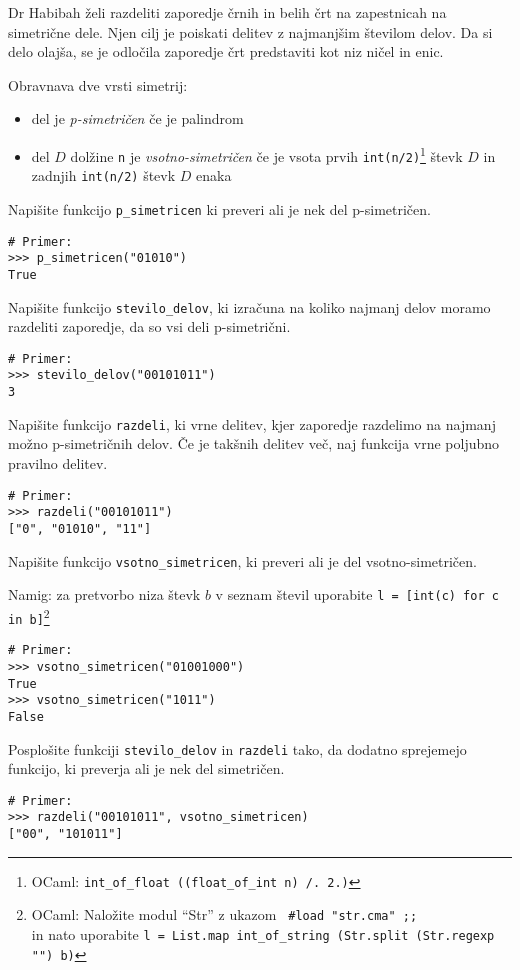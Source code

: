 \documentclass[arhiv]{../izpit}
\begin{document}
Dr Habibah želi razdeliti zaporedje črnih in belih črt na zapestnicah na simetrične dele. Njen cilj je poiskati delitev z najmanjšim številom delov.
Da si delo olajša, se je odločila zaporedje črt predstaviti kot niz ničel in enic.

Obravnava dve vrsti simetrij:
\begin{itemize}
\item del je \emph{p-simetričen} če je palindrom
\item del $D$ dolžine \verb|n| je \emph{vsotno-simetričen} če je vsota prvih
\verb|int(n/2)|\footnote{OCaml: \verb|int_of_float ((float_of_int n) /. 2.)|} števk $D$
  in zadnjih \verb|int(n/2)| števk $D$ enaka
\end{itemize}

\podnaloga
Napišite funkcijo \verb|p_simetricen| ki preveri ali je nek del p-simetričen.
\begin{verbatim}
# Primer:
>>> p_simetricen("01010")
True
\end{verbatim}

\podnaloga
Napišite funkcijo \verb|stevilo_delov|, ki izračuna na koliko najmanj delov moramo razdeliti zaporedje, da so vsi deli p-simetrični.

\begin{verbatim}
# Primer:
>>> stevilo_delov("00101011")
3
\end{verbatim}

\podnaloga
Napišite funkcijo \verb|razdeli|, ki vrne delitev, kjer zaporedje razdelimo na najmanj možno p-simetričnih delov. Če je takšnih delitev več, naj funkcija vrne poljubno pravilno delitev.

\begin{verbatim}
# Primer:
>>> razdeli("00101011")
["0", "01010", "11"]
\end{verbatim}

\podnaloga
Napišite funkcijo \verb|vsotno_simetricen|, ki preveri ali je del vsotno-simetričen.

Namig: za pretvorbo niza števk $b$ v seznam števil uporabite \verb|l = [int(c) for c in b]|\footnote{OCaml: Naložite modul ``Str'' z ukazom \verb| #load "str.cma" ;; |\\ in nato uporabite \verb|l = List.map int_of_string (Str.split (Str.regexp "") b)|}

\begin{verbatim}
# Primer:
>>> vsotno_simetricen("01001000")
True
>>> vsotno_simetricen("1011")
False
\end{verbatim}

\podnaloga
Posplošite funkciji \verb|stevilo_delov| in \verb|razdeli| tako, da dodatno sprejemejo funkcijo, ki preverja ali je nek del simetričen.

\begin{verbatim}
# Primer:
>>> razdeli("00101011", vsotno_simetricen)
["00", "101011"]
\end{verbatim}
\end{document}
